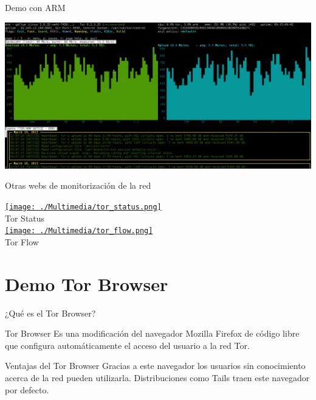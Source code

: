 \documentclass[10pt]{beamer}
\begin{document}
\begin{frame}[fragile]{Demo con ARM}
	\begin{center}
		\href{run:Multimedia/armvideo.mkv}{\includegraphics[scale=0.2]{./Multimedia/arm.png}}
	\end{center}
\end{frame}

\begin{frame}[fragile]{Otras webs de monitorización de la red}
	\begin{center}
		\href{https://torstatus.blutmagie.de}{\texttt{[image: ./Multimedia/tor\_status.png]}}
		\\
		Tor Status
		\\
		\vspace{15px}
		\href{https://torflow.uncharted.software/}{\texttt{[image: ./Multimedia/tor\_flow.png]}}
		\\
		Tor Flow
	\end{center}
\end{frame}

\section{Demo Tor Browser}

\begin{frame}[fragile]{¿Qué es el Tor Browser?}
	\pause
	\begin{block}{Tor Browser}
		Es una modificación del navegador Mozilla Firefox de código libre que configura automáticamente el acceso del usuario a la red Tor.
	\end{block}
	\pause
	\begin{alertblock}{Ventajas del Tor Browser}
		Gracias a este navegador los usuarios sin conocimiento acerca de la red pueden utilizarla. Distribuciones como Tails traen este navegador por defecto.
	\end{alertblock}
\end{frame}
\end{document}
